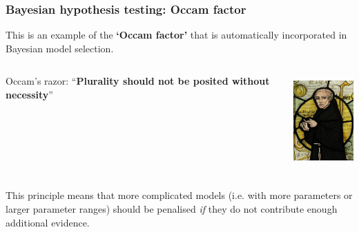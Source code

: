 \begin{frame}

\frametitle{Bayesian hypothesis testing: Occam factor}
\label{bayesianhypothesistesting:occamfactor}

This is an example of the \textbf{`Occam factor'} that is automatically incorporated in Bayesian
model selection.

\begin{columns}
     \begin{column}{0.6\textwidth}
\begin{center}
{\color{red} Occam's razor}: ``\textbf{Plurality should not be posited without necessity}''
\end{center}
\end{column}
\begin{column}{0.4\textwidth}

\includegraphics[keepaspectratio,width=\textwidth,height=100pt]{figures/Ockham.png}
\end{column}
\end{columns}
This principle means that more complicated models (i.e. with more parameters or larger parameter
ranges) should be penalised \emph{if} they do not contribute enough additional evidence.

\end{frame}

